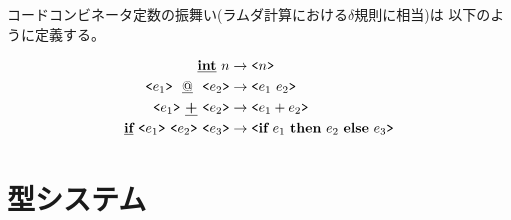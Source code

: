 コードコンビネータ定数の振舞い(ラムダ計算における$\delta$規則に相当)は
以下のように定義する。

\begin{align*}
  \cint~ n &\to \code{n} \\
  \code{e_1}~ \cat~ \code{e_2} &\to \code{e_1~ e_2} \\
  \code{e_1}~ \cPlus~ \code{e_2} &\to \code{e_1 + e_2} \\
  \cif{e_1}{e_2}{e_3} &\to \code{\ift{e_1}{e_2}{e_3}} 
\end{align*}
%


\section{型システム}

